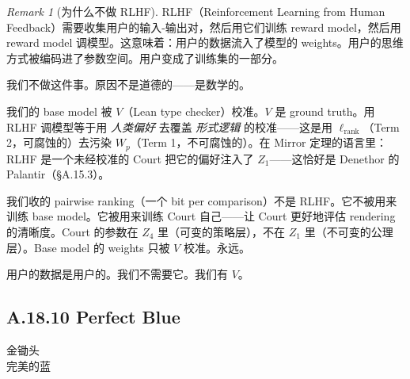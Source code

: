 \documentclass[11pt,a4paper]{article}
\theoremstyle{definition}
\theoremstyle{remark}
\newtheorem{remark}[theorem]{Remark}
\begin{document}
\begin{remark}[为什么不做 RLHF]
RLHF（Reinforcement Learning from Human Feedback）需要收集用户的输入-输出对，然后用它们训练 reward model，然后用 reward model 调模型。这意味着：用户的数据流入了模型的 weights。用户的思维方式被编码进了参数空间。用户变成了训练集的一部分。

我们不做这件事。原因不是道德的——是数学的。

我们的 base model 被 $V$（Lean type checker）校准。$V$ 是 ground truth。用 RLHF 调模型等于用 \emph{人类偏好} 去覆盖 \emph{形式逻辑} 的校准——这是用 $\ell_{\mathrm{rank}}$（Term 2，可腐蚀的）去污染 $W_p$（Term 1，不可腐蚀的）。在 Mirror 定理的语言里：RLHF 是一个未经校准的 Court 把它的偏好注入了 $Z_1$——这恰好是 Denethor 的 Palantir（\S A.15.3）。

我们收的 pairwise ranking（一个 bit per comparison）不是 RLHF。它不被用来训练 base model。它被用来训练 Court 自己——让 Court 更好地评估 rendering 的清晰度。Court 的参数在 $Z_4$ 里（可变的策略层），不在 $Z_1$ 里（不可变的公理层）。Base model 的 weights 只被 $V$ 校准。永远。

用户的数据是用户的。我们不需要它。我们有 $V$。
\end{remark}


\subsection{A.18.10 Perfect Blue}

\begin{center}
{\color{yellow!70!black} \large 金锄头}\\[6pt]
{\color{blue!80!black} \large 完美的蓝}
\end{center}

\bigskip
\end{document}
